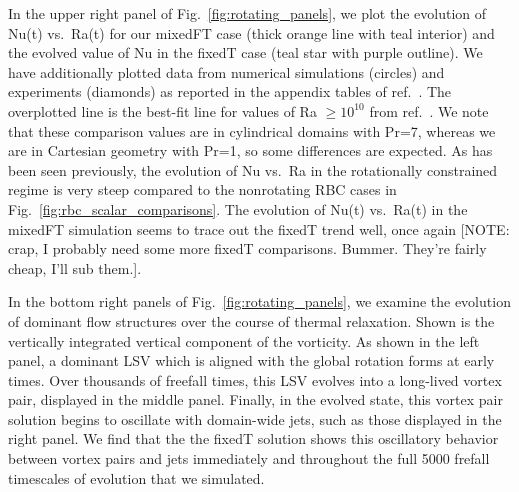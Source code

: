 \documentclass[aps, pre, onecolumn, nofootinbib, notitlepage, groupedaddress, amsfonts, amssymb, amsmath, longbibliography, superscriptaddress]{revtex4-1}
\begin{document}
In the upper right panel of Fig.~\ref{fig:rotating_panels}, we plot the evolution of Nu(t) vs.~Ra(t) for our mixedFT case (thick orange line with teal interior) and the evolved value of Nu in the fixedT case (teal star with purple outline).
We have additionally plotted data from numerical simulations (circles) and experiments (diamonds) as reported in the appendix tables of ref.~\cite{cheng&all2015}.
The overplotted line is the best-fit line for values of Ra $\geq 10^{10}$ from ref.~\cite{cheng&all2015}.
We note that these comparison values are in cylindrical domains with Pr=7, whereas we are in Cartesian geometry with Pr=1, so some differences are expected.
As has been seen previously, the evolution of Nu vs.~Ra in the rotationally constrained regime is very steep compared to the nonrotating RBC cases in Fig.~\ref{fig:rbc_scalar_comparisons}.
The evolution of Nu(t) vs.~Ra(t) in the mixedFT simulation seems to trace out the fixedT trend well, once again [NOTE: crap, I probably need some more fixedT comparisons. Bummer. They're fairly cheap, I'll sub them.].

In the bottom right panels of Fig.~\ref{fig:rotating_panels}, we examine the evolution of dominant flow structures over the course of thermal relaxation.
Shown is the vertically integrated vertical component of the vorticity.
As shown in the left panel, a dominant LSV which is aligned with the global rotation forms at early times.
Over thousands of freefall times, this LSV evolves into a long-lived vortex pair, displayed in the middle panel.
Finally, in the evolved state, this vortex pair solution begins to oscillate with domain-wide jets, such as those displayed in the right panel.
We find that the the fixedT solution shows this oscillatory behavior between vortex pairs and jets immediately and throughout the full 5000 frefall timescales of evolution that we simulated.
\end{document}
